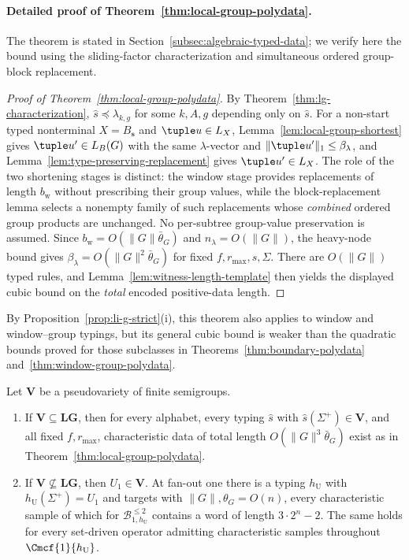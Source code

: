 \paragraph{Detailed proof of Theorem~\ref{thm:local-group-polydata}.}
The theorem is stated in Section~\ref{subsec:algebraic-typed-data};
we verify here the bound using the sliding-factor characterization
and simultaneous ordered group-block replacement.



\begin{proof}[Proof of Theorem~\ref{thm:local-group-polydata}]
By Theorem~\ref{thm:lg-characterization}, $\widehat{s}\preceq\lambda_{k,g}$ for some
$k,A,g$ depending only on $\widehat{s}$.  For a non-start typed nonterminal
$X=B_{\mathbf s}$ and $\tuple u\in L_X$,
Lemma~\ref{lem:local-group-shortest} gives $\tuple u'\in L_B(G)$ with the same
$\lambda$-vector and $\|\tuple u'\|_1\le\beta_\lambda$, and
Lemma~\ref{lem:type-preserving-replacement} gives $\tuple u'\in L_X$.  The role of the two shortening stages is distinct: the window stage
provides replacements of length $b_{\mathrm w}$ without prescribing their
group values, while the block-replacement lemma selects a nonempty family
of such replacements whose \emph{combined} ordered group products are
unchanged.  No per-subtree group-value preservation is assumed.  Since
$b_{\mathrm w}=O(\|G\|\bar\theta_G)$ and $n_\lambda=O(\|G\|)$,
the heavy-node bound gives $\beta_\lambda=O(\|G\|^2\bar\theta_G)$
for fixed $f,r_{\max},s,\Sigma$.
There are $O(\|G\|)$ typed rules, and
Lemma~\ref{lem:witness-length-template} then yields the displayed cubic
bound on the \emph{total} encoded positive-data length.
\end{proof}

By Proposition~\ref{prop:li-g-strict}(i), this theorem also applies to
window and window--group typings, but its general cubic bound is weaker
than the quadratic bounds proved for those subclasses in
Theorems~\ref{thm:boundary-polydata} and~\ref{thm:window-group-polydata}.

\begin{corollary}
\label{cor:pseudovariety-dichotomy}
Let $\mathbf V$ be a pseudovariety of finite semigroups.
\begin{enumerate}[label=\textup{(\roman*)},leftmargin=*]
\item If $\mathbf V\subseteq\mathbf{LG}$, then for every alphabet,
every typing $\widehat{s}$ with $\widehat{s}(\Sigma^+)\in\mathbf V$, and all fixed
$f,r_{\max}$, characteristic data of total length
$O(\|G\|^3\bar\theta_G)$ exist as in
Theorem~\ref{thm:local-group-polydata}.
\item If $\mathbf V\not\subseteq\mathbf{LG}$, then
$U_1\in\mathbf V$.  At fan-out one there is a typing $h_{\mathrm U}$ with
$h_{\mathrm U}(\Sigma^+)=U_1$ and targets with $\|G\|,\theta_G=O(n)$,
every characteristic sample of which for
$\mathcal B^{\le2}_{1,h_{\mathrm U}}$ contains a word of length
$3\cdot2^n-2$.  The same holds for every set-driven operator admitting
characteristic samples throughout $\Cmcf{1}{h_{\mathrm U}}$.
\end{enumerate}
\end{corollary}

